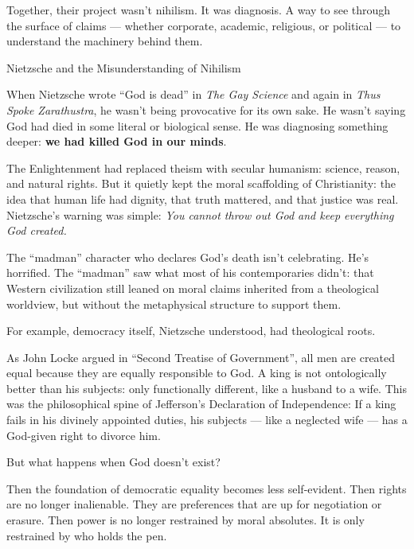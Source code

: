 Together, their project wasn’t nihilism.  
It was diagnosis.  
A way to see through the surface of claims — whether corporate, academic, religious, or political — to understand the machinery 
behind them.

\medskip

\begin{HistoricalSidebar}{Nietzsche and the Misunderstanding of Nihilism}

  When Nietzsche wrote “God is dead” in \textit{The Gay Science} and again in \textit{Thus Spoke Zarathustra}, 
  he wasn’t being provocative for its own sake.  
  He wasn’t saying God had died in some literal or biological sense.  
  He was diagnosing something deeper: \textbf{we had killed God in our minds}.

  \medskip
  
  The Enlightenment had replaced theism with secular humanism: science, reason, and natural rights.  
  But it quietly kept the moral scaffolding of Christianity: the idea that human life had dignity, that truth mattered, 
  and that justice was real.  
  Nietzsche’s warning was simple: \textit{You cannot throw out God and keep everything God created.}

  \medskip
  
  The ``madman'' character who declares God's death isn’t celebrating. He’s horrified.  
  The ``madman'' saw what most of his contemporaries didn’t: that Western civilization still leaned on 
  moral claims inherited from a theological worldview, but without the metaphysical structure to support them.
  
  \medskip
  
  For example, democracy itself, Nietzsche understood, had theological roots.

  \medskip
  
  As John Locke argued in ``Second Treatise of Government'', all men are created equal because they are equally 
  responsible to God.  
  A king is not ontologically better than his subjects: only functionally different, like a husband to a wife.  
  This was the philosophical spine of Jefferson’s Declaration of Independence:  
  If a king fails in his divinely appointed duties, his subjects — like a neglected wife — has a God-given right 
  to divorce him.

  \medskip
  
  But what happens when God doesn’t exist?

  \medskip
  
  Then the foundation of democratic equality becomes less self-evident.  
  Then rights are no longer inalienable. They are preferences that are up for negotiation or erasure.  
  Then power is no longer restrained by moral absolutes. It is only restrained by who holds the pen.
  

\end{HistoricalSidebar}
